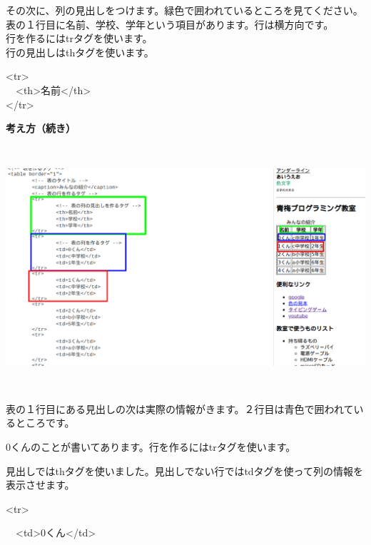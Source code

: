 \documentclass[a4paper,12pt]{jarticle}
\begin{document}
\bigskip

その次に、列の見出しをつけます。緑色で囲われているところを見てください。\\
表の１行目に名前、学校、学年という項目があります。行は横方向です。\\
行を作るにはtrタグを使います。\\
行の見出しはthタグを使います。\\


\bigskip

{\textless}tr{\textgreater}\\
\ \ {\textless}th{\textgreater}名前{\textless}/th{\textgreater}\\
{\textless}/tr{\textgreater}\\

\bigskip

\clearpage
\textbf{考え方（続き）}



\bigskip

\bigskip


\centering
\includegraphics[width=16.388cm,height=9.036cm]{textbook-img191.png}

\flushleft

\bigskip

表の１行目にある見出しの次は実際の情報がきます。２行目は青色で囲われているところです。

0くんのことが書いてあります。行を作るにはtrタグを使います。

見出しではthタグを使いました。見出しでない行ではtdタグを使って列の情報を表示させます。

{\textless}tr{\textgreater}

\ \ {\textless}td{\textgreater}0くん{\textless}/td{\textgreater}
\end{document}
